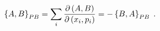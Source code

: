 \begin{equation}
\left\{  A,B\right\}  _{{\footnotesize PB}}=\sum_{i}\frac{\partial\left(
A,B\right)  }{\partial\left(  x_{i},p_{i}\right)  }=-\left\{  B,A\right\}
_{{\footnotesize PB}}\;.
\end{equation}

